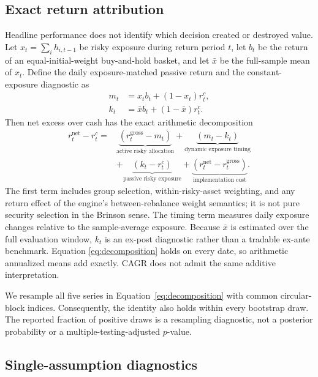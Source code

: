\documentclass{article}
\begin{document}
\subsection{Exact return attribution}

Headline performance does not identify which decision created or destroyed
value. Let $x_t=\sum_i h_{i,t-1}$ be risky exposure during return period $t$,
let $b_t$ be the return of an equal-initial-weight buy-and-hold basket, and let
$\bar{x}$ be the full-sample mean of $x_t$. Define the daily exposure-matched
passive return and the constant-exposure diagnostic as
\begin{align}
  m_t &= x_t b_t + (1-x_t)r^c_t, \\
  k_t &= \bar{x} b_t + (1-\bar{x})r^c_t.
\end{align}
Then net excess over cash has the exact arithmetic decomposition
\begin{align}
  r^{\mathrm{net}}_t-r^c_t
  ={}& \underbrace{(r^{\mathrm{gross}}_t-m_t)}_{\text{active risky allocation}}
  + \underbrace{(m_t-k_t)}_{\text{dynamic exposure timing}} \nonumber\\
  &+ \underbrace{(k_t-r^c_t)}_{\text{passive risky exposure}}
  + \underbrace{(r^{\mathrm{net}}_t-r^{\mathrm{gross}}_t)}_{\text{implementation cost}}.
  \label{eq:decomposition}
\end{align}
The first term includes group selection, within-risky-asset weighting, and any
return effect of the engine's between-rebalance weight semantics; it is not
pure security selection in the Brinson sense. The timing term measures daily
exposure changes relative to the sample-average exposure. Because
$\bar{x}$ is estimated over the full evaluation window, $k_t$ is an ex-post
diagnostic rather than a tradable ex-ante benchmark. Equation
\ref{eq:decomposition} holds on every date, so arithmetic annualized means add
exactly. CAGR does not admit the same additive interpretation.

We resample all five series in Equation~\ref{eq:decomposition} with common
circular-block indices. Consequently, the identity also holds within every
bootstrap draw. The reported fraction of positive draws is a resampling
diagnostic, not a posterior probability or a multiple-testing-adjusted
$p$-value.

\subsection{Single-assumption diagnostics}
\end{document}

